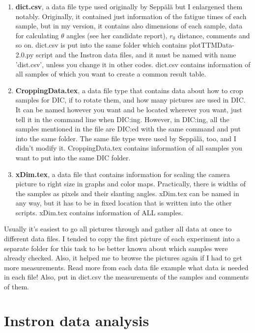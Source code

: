 \documentclass[a4paper]{article}
\begin{document}
\begin{enumerate}
\item \textbf{dict.csv}, a data file type used originally by Sepp\"{a}l\"{a} 
but I enlargened them notably. Originally, it contained just information of 
the fatigue times of each sample, but in my version, it contains also 
dimensions of each sample, data for calculating $\theta$ angles (see her 
candidate report), $r_0$ distance, comments and so on. dict.csv is put into 
the same folder which contains plotTTMData-2.0.py script and the Instron data 
files, and it must be named with name 'dist.csv', unless you change it in 
other codes. dict.csv contains information of all samples of which you want 
to create a common result table.

\item \textbf{CroppingData.tex}, a data file type that contains data about 
how to crop samples for DIC, if to rotate them, and how many pictures are 
used in DIC. It can be named however you want and be located wherever you 
want, just tell it in the command line when DIC:ing. However, in DIC:ing, all 
the samples mentioned in the file are DIC:ed with the same command and put 
into the same folder. The same file type were used by Sepp\"{a}l\"{a}, too, 
and I didn't modify it. CroppingData.tex contains information of all samples 
you want to put into the same DIC folder.

\item \textbf{xDim.tex}, a data file that contains information for scaling 
the camera picture to right size in graphs and color maps. Practically, 
there is widths of the samples as pixels and their slanting angles. xDim.tex 
can be named in any way, but it has to be in fixed location that is written 
into the other scripts. xDim.tex contains information of ALL samples.
\end{enumerate}

Usually it's easiest to go all pictures through and gather all data at once 
to different data files. I tended to copy the first picture of each experiment 
into a separate folder for this task to be better known about which samples 
were already checked. Also, it helped me to browse the pictures again if I 
had to get more measurements. Read more from each data file example what data 
is needed in each file! Also, put in dict.csv the measurements of the samples 
and comments of them.

\section{Instron data analysis}
\end{document}
